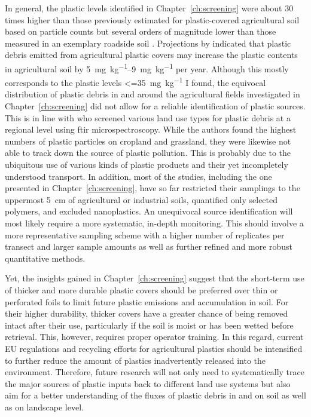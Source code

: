 In general, the plastic levels identified in Chapter~\ref{ch:screening} were about \num{30} times higher than those previously estimated for plastic-covered agricultural soil based on particle counts \citep{BuksGlobal2020} but several orders of magnitude lower than those measured in an exemplary roadside soil \citep{DierkesQuantification2019}. Projections by \citet{BrandesIdentifying2021} indicated that plastic debris emitted from agricultural plastic covers may increase the plastic contents in agricultural soil by \SIrange{5}{9}{\milli\gram\per\kilo\gram} per year.
Although this mostly corresponds to the plastic levels \SI{<=35}{\milli\gram\per\kilo\gram} I found, the equivocal distribution of plastic debris in and around the agricultural fields investigated in Chapter~\ref{ch:screening} did not allow for a reliable identification of plastic sources. This is in line with \citet{CorradiniMicroplastics2021} who screened various land use types for plastic debris at a regional level using \ac{ftir} microspectroscopy. While the authors found the highest numbers of plastic particles on cropland and grassland, they were likewise not able to track down the source of plastic pollution. This is probably due to the ubiquitous use of various kinds of plastic products and their yet incompletely understood transport. In addition, most of the studies, including the one presented in Chapter~\ref{ch:screening}, have so far restricted their samplings to the uppermost \SI{5}{\centi\meter} of agricultural or industrial soils, quantified only selected polymers, and excluded nanoplastics. An unequivocal source identification will most likely require a more systematic, in-depth monitoring. This should involve a more representative sampling scheme with a higher number of replicates per transect and larger sample amounts as well as further refined and more robust quantitative methods.

Yet, the insights gained in Chapter~\ref{ch:screening} suggest that the short-term use of thicker and more durable plastic covers should be preferred over thin or perforated foils to limit future plastic emissions and accumulation in soil. For their higher durability, thicker covers have a greater chance of being removed intact after their use, particularly if the soil is moist or has been wetted before retrieval. This, however, requires proper operator training. In this regard, current EU regulations \citep{EN13655Plastics2018} and recycling efforts for agricultural plastics should be intensified to further reduce the amount of plastics inadvertently released into the environment.
Therefore, future research will not only need to systematically trace the major sources of plastic inputs back to different land use systems but also aim for a better understanding of the fluxes of plastic debris in and on soil as well as on landscape level.

